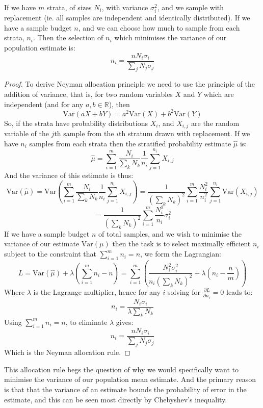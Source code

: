 \begin{theorem}\label{thm:neyman_selection}
If we have $m$ strata, of sizes $N_i$, with variance $\sigma_i^2$, and we sample with replacement (ie. all samples are independent and identically distributed). If we have a sample budget $n$, and we can choose how much to sample from each strata, $n_i$.
Then the selection of $n_i$ which minimises the variance of our population estimate is:
$$n_i = \frac{nN_i\sigma_i}{\sum_jN_j\sigma_j}$$
\end{theorem}
\begin{proof}
To derive Neyman allocation principle we need to use the principle of the addition of variance, that is, for two random variables $X$ and $Y$ which are independent (and for any $a,b\in \mathbb{R}$), then $$\text{Var}(aX+bY) = a^2\text{Var}(X)+b^2\text{Var}(Y)$$
So, if the strata have probability distributions $X_i$, and $X_{i,j}$ are the random variable of the $j$th sample from the $i$th stratum drawn with replacement. If we have $n_i$ samples from each strata then the stratified probability estimate $\hat{\mu}$ is:
$$ \hat{\mu} = \sum_{i=1}^m\frac{N_i}{\sum_kN_k}\frac{1}{n_i}\sum_{j=1}^{n_i}X_{i,j} $$
And the variance of this estimate is thus:
$$ \text{Var}(\hat{\mu}) = \text{Var}\left(\sum_{i=1}^m\frac{N_i}{\sum_kN_k}\frac{1}{n_i}\sum_{j=1}^{n_i}X_{i,j}\right) = \frac{1}{\left(\sum_kN_k\right)^2}\sum_{i=1}^m\frac{N_i^2}{n_i^2}\sum_{j=1}^{n_i}\text{Var}(X_{i,j})$$
\begin{equation}\label{eq:variance_decomposition_for_strata_mean}= \frac{1}{\left(\sum_kN_k\right)^2} \sum_{i=1}^m\frac{N_i^2}{n_i}\sigma_i^2 \end{equation}
If we have a sample budget $n$ of total samples, and we wish to minimise the variance of our estimate $\text{Var}(\mu)$ then the task is to select maximally efficient $n_i$ subject to the constraint that $\sum_{i=1}^m n_i = n$, we form the Lagrangian:
$$L = \text{Var}(\hat{\mu}) + \lambda\left(\sum_{i=1}^mn_i-n\right) = \sum_{i=1}^m\left(\frac{N_i^2\sigma_i^2}{n_i\left(\sum_kN_k\right)^2} + \lambda \left(n_i-\frac{n}{m}\right)\right)$$
Where $\lambda$ is the Lagrange multiplier, hence for any $i$ solving for $\frac{\partial L}{\partial n_i}=0$ leads to:
$$n_i = \frac{N_i\sigma_i}{\lambda\sum_kN_k}$$
Using $\sum_{i=1}^m n_i = n$, to eliminate $\lambda$ gives:
$$n_i = \frac{nN_i\sigma_i}{\sum_jN_j\sigma_j}$$
Which is the Neyman allocation rule.
\end{proof}

This allocation rule begs the question of why we would specifically want to minimise the variance of our population mean estimate.
And the primary reason is that that the variance of an estimate bounds the probability of error in the estimate, and this can be seen most directly by Chebyshev's inequality.

